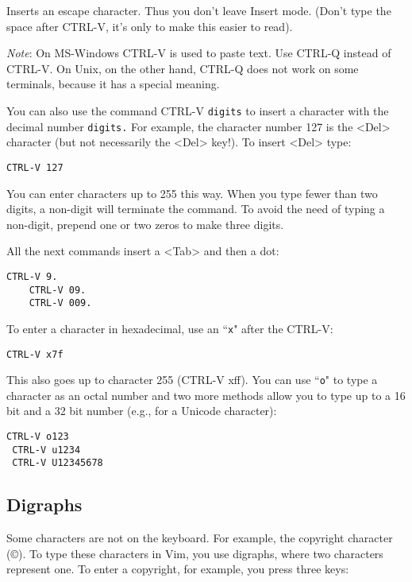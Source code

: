 Inserts an escape character.
Thus you don't leave Insert mode.
(Don't type the space after CTRL-V, it's only to make this easier to read).

\emph{Note}: On MS-Windows CTRL-V is used to paste text.
Use CTRL-Q instead of CTRL-V.
On Unix, on the other hand, CTRL-Q does not work on some terminals, because it has a special meaning.

You can also use the command CTRL-V \texttt{{digits}} to insert a character with the decimal number \texttt{{digits}.}
For example, the character number 127 is the <Del> character (but not necessarily the <Del> key!).
To insert <Del> type:

\begin{Verbatim}[samepage=true]
 CTRL-V 127
\end{Verbatim}

You can enter characters up to 255 this way.
When you type fewer than two digits, a non-digit will terminate the command.
To avoid the need of typing a non-digit, prepend one or two zeros to make three digits.

All the next commands insert a <Tab> and then a dot:

\begin{Verbatim}[samepage=true]
    CTRL-V 9.
    CTRL-V 09.
    CTRL-V 009.
\end{Verbatim}

To enter a character in hexadecimal, use an ``\texttt{x}" after the CTRL-V:

\begin{Verbatim}[samepage=true]
 CTRL-V x7f
\end{Verbatim}

This also goes up to character 255 (CTRL-V xff).
You can use ``\texttt{o}" to type a character as an octal number and two more methods allow you to type up to a 16 bit and a 32 bit number (e.g., for a Unicode character):

\begin{Verbatim}[samepage=true]
 CTRL-V o123
 CTRL-V u1234
 CTRL-V U12345678
\end{Verbatim}
\subsection{Digraphs}
\label{Digraphs}
Some characters are not on the keyboard.
For example, the copyright character (©).
To type these characters in Vim, you use digraphs, where two characters represent one.
To enter a copyright, for example, you press three keys:

